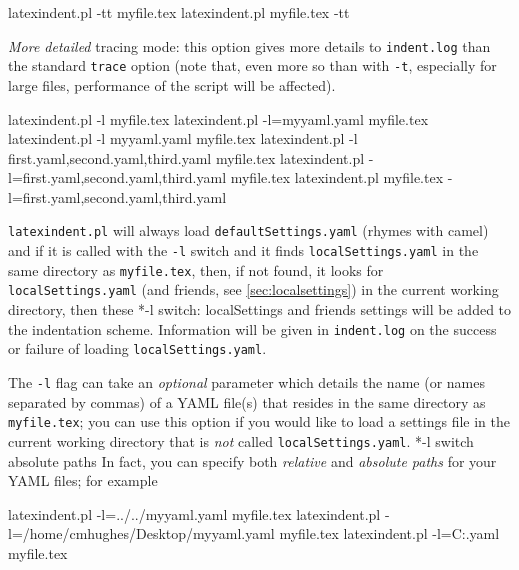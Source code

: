 
 \begin{commandshell}
latexindent.pl -tt myfile.tex
latexindent.pl myfile.tex -tt
\end{commandshell}

 \emph{More detailed} tracing mode: this option gives more details to
 \texttt{indent.log}
 than the standard \texttt{trace} option (note that, even more so than with \texttt{-t},
 especially for large files, performance of the script will be affected).


 \begin{commandshell}
latexindent.pl -l myfile.tex
latexindent.pl -l=myyaml.yaml myfile.tex
latexindent.pl -l myyaml.yaml myfile.tex
latexindent.pl -l first.yaml,second.yaml,third.yaml myfile.tex
latexindent.pl -l=first.yaml,second.yaml,third.yaml myfile.tex
latexindent.pl myfile.tex -l=first.yaml,second.yaml,third.yaml 
\end{commandshell}

 \label{page:localswitch}
 \texttt{latexindent.pl} will always load \texttt{defaultSettings.yaml} (rhymes with
 camel) and if it is called with the \texttt{-l} switch and it finds
 \texttt{localSettings.yaml} in the same directory as \texttt{myfile.tex}, then, if not
 found, it looks for \texttt{localSettings.yaml} (and friends, see
 \vref{sec:localsettings}) in the current working directory, then
 these%
 *{-l switch: localSettings and
 friends} settings will be added to the indentation scheme. Information will be given in
 \texttt{indent.log} on the success or failure of loading \texttt{localSettings.yaml}.

 The \texttt{-l} flag can take an \emph{optional} parameter which details the name (or
 names separated by commas) of a YAML file(s) that resides in the same directory as
 \texttt{myfile.tex}; you can use this option if you would like to load a settings file
 in the current working directory that is \emph{not} called \texttt{localSettings.yaml}.
 *{-l switch absolute paths} In fact, you can specify both
 \emph{relative} and \emph{absolute paths} for your YAML files; for example%

 \begin{commandshell}
latexindent.pl -l=../../myyaml.yaml myfile.tex
latexindent.pl -l=/home/cmhughes/Desktop/myyaml.yaml myfile.tex
latexindent.pl -l=C:\Users\cmhughes\Desktop\myyaml.yaml myfile.tex
\end{commandshell}


